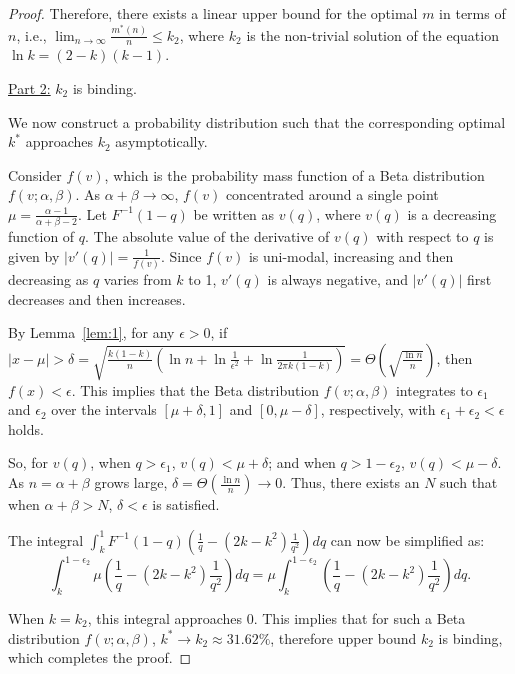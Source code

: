 \begin{proof}
Therefore, there exists a linear upper bound for the optimal \(m\) in terms of \(n\), i.e., \(\lim_{n \rightarrow \infty} \frac{m^*(n)}{n} \leq k_2\), where \(k_2\) is the non-trivial solution of the equation \(\ln k = (2-k)(k-1)\).

\underline{Part 2:} \(k_2\) is binding.

We now construct a probability distribution such that the corresponding optimal \(k^*\) approaches \(k_2\) asymptotically.

Consider \(f(v)\), which is the probability mass function of a Beta distribution \(f(v; \alpha, \beta)\). As \(\alpha + \beta \to \infty\), \(f(v)\) concentrated around a single point \(\mu = \frac{\alpha - 1}{\alpha + \beta - 2}\). Let \(F^{-1}(1-q)\) be written as \(v(q)\), where \(v(q)\) is a decreasing function of \(q\). The absolute value of the derivative of \(v(q)\) with respect to \(q\) is given by \(|v'(q)| = \frac{1}{f(v)}\). Since \(f(v)\) is uni-modal, increasing and then decreasing as \(q\) varies from \(k\) to 1, \(v'(q)\) is always negative, and \(|v'(q)|\) first decreases and then increases.

By Lemma~\ref{lem:1}, for any \(\epsilon > 0\), if \(|x-\mu| > \delta = \sqrt{\frac{k(1-k)}{n} \left( \ln n + \ln \frac{1}{\epsilon^2} + \ln \frac{1}{2 \pi k(1-k)} \right)} = \Theta\left(\sqrt{\frac{\ln n}{n}}\right)\), then \(f(x) < \epsilon\). This implies that the Beta distribution \(f(v; \alpha, \beta)\) integrates to \(\epsilon_1\) and \(\epsilon_2\) over the intervals \([\mu + \delta, 1]\) and \([0, \mu - \delta]\), respectively, with \(\epsilon_1 + \epsilon_2 < \epsilon\) holds.

So, for \(v(q)\), when \(q > \epsilon_1\), \(v(q) < \mu + \delta\); and when \(q > 1 - \epsilon_2\), \(v(q) < \mu - \delta\). As \(n = \alpha + \beta\) grows large, \(\delta = \Theta\left(\frac{\ln n}{n}\right) \to 0\). Thus, there exists an \(N\) such that when \(\alpha + \beta > N\), \(\delta < \epsilon\) is satisfied.

The integral \(\int_k^1 F^{-1}(1-q)\left(\frac{1}{q} - (2k-k^2)\frac{1}{q^2}\right) dq\) can now be simplified as:
\[
\int_k^{1-\epsilon_2} \mu \left(\frac{1}{q} - (2k-k^2)\frac{1}{q^2}\right) dq = \mu \int_k^{1-\epsilon_2} \left(\frac{1}{q} - (2k-k^2)\frac{1}{q^2}\right) dq.
\]

When \(k = k_2\), this integral approaches 0. This implies that for such a Beta distribution \(f(v; \alpha, \beta)\), \(k^* \to k_2 \approx 31.62\%\), therefore upper bound $k_2$ is binding, which completes the proof. 
\end{proof}

